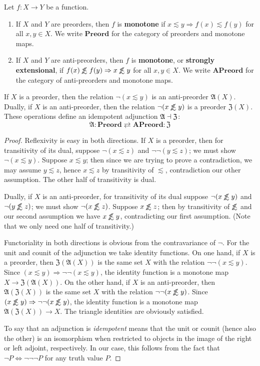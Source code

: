 \documentclass{article}
\def\oapt{\mathrel{\!\not\,\not\lesssim}}
\def\leapx{\lesssim}
\let\implies\Rightarrow
\def\anti{\mathfrak{A}}
\def\neigh{\mathfrak{Z}}
\def\Preord{\mathbf{Preord}}
\def\APreord{\mathbf{APreord}}
\begin{document}
\begin{defn}
  Let $f:X\to Y$ be a function.
  \begin{enumerate}
  \item If $X$ and $Y$ are preorders, then $f$ is \textbf{monotone} if $x\leapx y \implies f(x)\leapx f(y)$ for all $x,y\in X$.
    We write $\Preord$ for the category of preorders and monotone maps.
  \item If $X$ and $Y$ are anti-preorders, then $f$ is \textbf{monotone}, or \textbf{strongly extensional}, if $f(x)\oapt f(y) \implies x\oapt y$ for all $x,y\in X$.
    We write $\APreord$ for the category of anti-preorders and monotone maps.
  \end{enumerate}
\end{defn}

\begin{thm}\label{thm:ord-le-apt}
  If $X$ is a preorder, then the relation $\neg(x\leapx y)$ is an anti-preorder $\anti(X)$.
  Dually, if $X$ is an anti-preorder, then the relation $\neg(x\oapt y)$ is a preorder $\neigh(X)$.
  These operations define an idempotent adjunction $\anti\adj\neigh$:
  \[\anti : \Preord \rightleftarrows \APreord : \neigh\]
\end{thm}
\begin{proof}
  Reflexivity is easy in both directions.
  If $X$ is a preorder, then for transitivity of its dual, suppose $\neg(x\leapx z)$ and $\neg\neg(y\leapx z)$; we must show $\neg(x\leapx y)$.
  Suppose $x\leapx y$; then since we are trying to prove a contradiction, we may assume $y\leapx z$, hence $x\leapx z$ by transitivity of $\leapx$, contradiction our other assumption.
  The other half of transitivity is dual.

  Dually, if $X$ is an anti-preorder, for transitivity of its dual suppose $\neg (x\oapt y)$ and $\neg (y\oapt z)$; we must show $\neg(x\oapt z)$.
  Suppose $x\oapt z$; then by transitivity of $\oapt$ and our second assumption we have $x\oapt y$, contradicting our first assumption.
  (Note that we only need one half of transitivity.)

  Functoriality in both directions is obvious from the contravariance of $\neg$.
  For the unit and counit of the adjunction we take identity functions.
  On one hand, if $X$ is a preorder, then $\neigh(\anti(X))$ is the same set $X$ with the relation $\neg\neg(x\leapx y)$.
  Since $(x\leapx y) \implies \neg\neg(x\leapx y)$, the identity function is a monotone map $X\to \neigh(\anti(X))$.
  On the other hand, if $X$ is an anti-preorder, then $\anti(\neigh(X))$ is the same set $X$ with the relation $\neg\neg(x\oapt y)$.
  Since $(x\oapt y) \implies \neg\neg(x\oapt y)$, the identity function is a monotone map $\anti(\neigh(X)) \to X$.
  The triangle identities are obviously satisfied.

  To say that an adjunction is \emph{idempotent} means that the unit or counit (hence also the other) is an isomorphism when restricted to objects in the image of the right or left adjoint, respectively.
  In our case, this follows from the fact that $\neg P \iff \neg\neg\neg P$ for any truth value $P$.
\end{proof}
\end{document}
